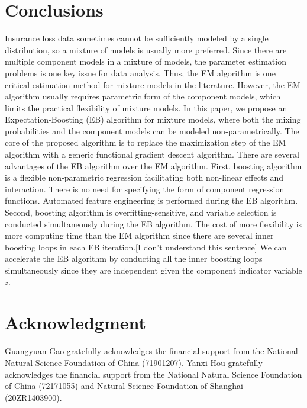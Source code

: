 \documentclass[11pt]{article}
\numberwithin{equation}{section}
\begin{document}
\section{Conclusions}\label{sec:conclusions}
Insurance loss data sometimes cannot be sufficiently modeled by a single distribution, so a mixture of models is usually more preferred. Since there are multiple component models in a mixture of models, the parameter estimation problems is one key issue for data analysis. Thus, the EM algorithm is one critical estimation method for mixture models in the literature.
However, the EM algorithm usually requires parametric form of the component models, which limits the practical flexibility of mixture models.
In this paper, we propose an Expectation-Boosting (EB) algorithm for mixture models, where both the mixing probabilities and the component models can be modeled non-parametrically. 
The core of the proposed algorithm is to replace the maximization step of the EM algorithm with a generic functional gradient descent algorithm.
There are several advantages of the EB algorithm over the EM algorithm. 
First, boosting algorithm is a flexible non-parametric regression facilitating both {non-linear effects and interaction}.  
There is no need for specifying the form of component regression functions.
Automated feature engineering is performed during the EB algorithm.
Second, boosting algorithm is {overfitting-sensitive}, and {variable selection} is conducted simultaneously during the EB algorithm.
The cost of more flexibility is more computing time than the EM algorithm since there are several inner boosting loops in each EB iteration.{\color{blue}[I don't understand this sentence]}
We can accelerate the EB algorithm by conducting all the inner boosting loops simultaneously since they are independent given the component indicator variable $z$.

	\section*{Acknowledgment}
Guangyuan Gao gratefully acknowledges the financial support from the National Natural Science Foundation of China (71901207). Yanxi Hou gratefully acknowledges the financial support from the National Natural Science Foundation of China (72171055) and Natural Science Foundation of Shanghai (20ZR1403900).



\end{document}
